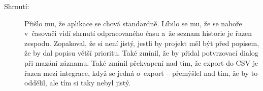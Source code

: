 \begin{description}
\item[Shrnutí:] Přišlo mu, že aplikace se chová standardně. Líbilo se mu, že se nahoře v~časovači vidí shrnutí odpracovaného času a~že seznam historie je řazen zespodu. Zopakoval, že si není jistý, jestli by projekt měl být před popisem, že by dal popisu větší prioritu. Také zmínil, že by přidal potvrzovací dialog při mazání záznamu. Také zmínil překvapení nad tím, že export do CSV je řazen mezi integrace, když se jedná o~export – přemýšlel nad tím, že by to oddělil, ale tím si taky nebyl jistý.
\end{description}






















































